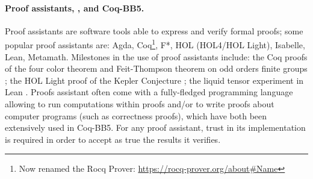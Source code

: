 \documentclass[a4paper,british]{article}
\theoremstyle{definition} %
\numberwithin{equation}{section}
\theoremstyle{definition} %
\newcommand{\ts}[1]{{\color{red}#1}}
\newcommand{\CoqBB}{Coq-BB5\xspace}
\begin{document}

\paragraph{Proof assistants, \Coq, and \CoqBB.} Proof assistants are software tools able to express and verify formal proofs; some popular proof assistants are: Agda, Coq\footnote{Now renamed the Rocq Prover: \url{https://rocq-prover.org/about\#Name}}, F*, HOL (HOL4/HOL Light), Isabelle, Lean, Metamath. Milestones in the use of proof assistants include: the Coq proofs of the four color theorem \cite{gonthier2008formal, gonthier2023computer} and Feit-Thompson theorem on odd orders finite groups \cite{gonthier2013machine}; the HOL Light proof of the Kepler Conjecture \cite{3fdf2c9143a54629bba02e34f24c7698}; the liquid tensor experiment in Lean \cite{2309.14870}. Proofs assistant often come with a fully-fledged programming language allowing to run computations within proofs and/or to write proofs about computer programs (such as correctness proofs), which have both been extensively used in \CoqBB. For any proof assistant, trust in its implementation is required in order to accept as true the results it verifies.
\end{document}
